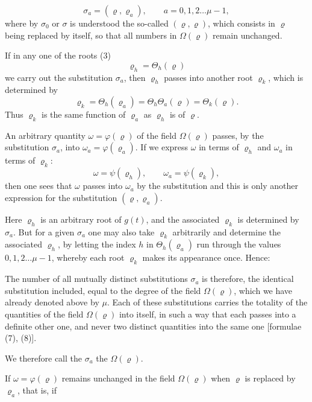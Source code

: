 
\[
\sigma_a = (\varrho, \varrho_a), \qquad a = 0, 1, 2 \ldots \mu - 1,
\]
where by $\sigma_0$ or $\sigma$ is understood the so-called  $(\varrho, \varrho)$, which consists in $\varrho$ being replaced by itself, so that all numbers in $\Omega(\varrho)$ remain unchanged.

If in any one of the roots (3)
\[
\varrho_h = \Theta_h(\varrho)
\]
we carry out the substitution $\sigma_a$, then $\varrho_h$ passes into another root $\varrho_k$, which is determined by
\[
\varrho_k = \Theta_h(\varrho_a) = \Theta_h \Theta_a(\varrho) = \Theta_k(\varrho).
\]
Thus $\varrho_k$ is the same function of $\varrho_a$ as $\varrho_h$ is of $\varrho$.

An arbitrary quantity $\omega = \varphi(\varrho)$ of the field $\Omega(\varrho)$ passes, by the substitution $\sigma_a$, into $\omega_a = \varphi(\varrho_a)$. If we express $\omega$ in terms of $\varrho_h$ and $\omega_a$ in terms of $\varrho_k$:
\[
\omega = \psi(\varrho_h), \qquad \omega_a = \psi(\varrho_k),
\]
then one sees that $\omega$ passes into $\omega_a$ by the substitution
and this is only another expression for the substitution $(\varrho, \varrho_a)$.

Here $\varrho_h$ is an arbitrary root of $g(t)$, and the associated $\varrho_k$ is determined by $\sigma_a$. But for a given $\sigma_a$ one may also take $\varrho_k$ arbitrarily and determine the associated $\varrho_h$, by letting the index $h$ in $\Theta_h(\varrho_a)$ run through the values $0, 1, 2 \ldots \mu - 1$, whereby each root $\varrho_k$ makes its appearance once. Hence:


The number of all mutually distinct substitutions $\sigma_a$ is therefore, the identical substitution included, equal to the degree of the field $\Omega(\varrho)$, which we have already denoted above by $\mu$. Each of these substitutions carries the totality of the quantities of the field $\Omega(\varrho)$ into itself, in such a way that each passes into a definite other one, and never two distinct quantities into the same one [formulae (7), (8)].

We therefore call the $\sigma_a$ the  $\Omega(\varrho)$.

If $\omega = \varphi(\varrho)$ remains unchanged in the field $\Omega(\varrho)$ when $\varrho$ is replaced by $\varrho_a$, that is, if
